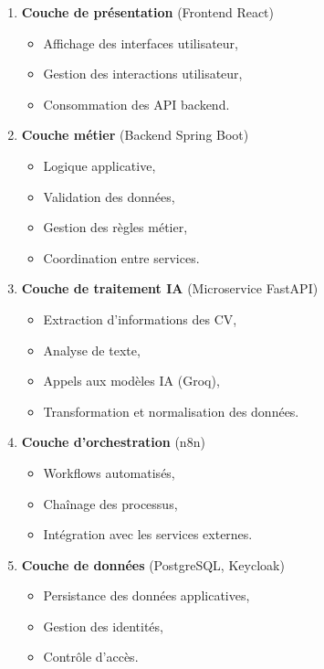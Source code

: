 \begin{enumerate}
    \item \textbf{Couche de présentation} (Frontend React)
    \begin{itemize}
        \item Affichage des interfaces utilisateur,
        \item Gestion des interactions utilisateur,
        \item Consommation des API backend.
    \end{itemize}
    
    \item \textbf{Couche métier} (Backend Spring Boot)
    \begin{itemize}
        \item Logique applicative,
        \item Validation des données,
        \item Gestion des règles métier,
        \item Coordination entre services.
    \end{itemize}
    
    \item \textbf{Couche de traitement IA} (Microservice FastAPI)
    \begin{itemize}
        \item Extraction d'informations des CV,
        \item Analyse de texte,
        \item Appels aux modèles IA (Groq),
        \item Transformation et normalisation des données.
    \end{itemize}
    
    \item \textbf{Couche d'orchestration} (n8n)
    \begin{itemize}
        \item Workflows automatisés,
        \item Chaînage des processus,
        \item Intégration avec les services externes.
    \end{itemize}
    
    \item \textbf{Couche de données} (PostgreSQL, Keycloak)
    \begin{itemize}
        \item Persistance des données applicatives,
        \item Gestion des identités,
        \item Contrôle d'accès.
    \end{itemize}
\end{enumerate}


